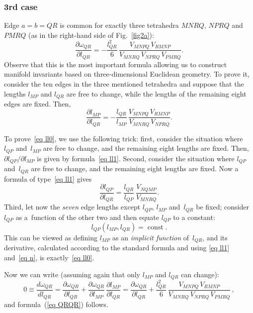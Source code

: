 \documentclass[pdftex]{sigma}
\DeclareMathOperator{\const}{const}
\begin{document}
\subsubsection*{3rd case}
Edge $a=b=QR$ is common for exactly three tetrahedra $MNRQ$, $NPRQ$ and~$PMRQ$ (as in the right-hand side of Fig.~\ref{fig2a}):
\begin{equation}
\frac{\partial \omega_{QR}}{\partial l_{QR}} = -\frac {l_{QR}^2}{6}\, \frac {V_{MNPQ}\,V_{RMNP}}{V_{MNRQ}\,V_{NPRQ}\,V_{PMRQ}}.
\label{eq QRQR}
\end{equation}
Observe that this is the most important formula allowing us to construct manifold invariants based on three-dimensional Euclidean geometry. To prove it, consider the ten edges in the three mentioned tetrahedra and suppose that the lengths $l_{MP}$ and $l_{QR}$ are free to change, while the lengths of the remaining eight edges are f\/ixed. Then,
\begin{equation}
\frac{\partial l_{MP}}{\partial l_{QR}} = -\frac{l_{QR}}{l_{MP}}\, \frac{V_{MNPQ}\,V_{RMNP}}{V_{MNRQ}\, V_{NPRQ}}.
\label{eq ll0}
\end{equation}

To prove~\eqref{eq ll0}, we use the following trick: f\/irst, consider the situation where $l_{QP}$ and~$l_{MP}$ are free to change, and the remaining eight lengths are f\/ixed. Then, $\partial l_{QP} / \partial l_{MP}$ is given by formula~\eqref{eq ll1}. Second, consider the situation where $l_{QP}$ and~$l_{QR}$ are free to change, and the remaining eight lengths are f\/ixed. Now a formula of type~\eqref{eq ll1} gives
\begin{equation}
\frac{\partial l_{QP}}{\partial l_{QR}} = \frac{l_{QR}}{l_{QP}}\, \frac{V_{NQMP}}{V_{MNRQ}}.
\label{eq n}
\end{equation}
Third, let now the \emph{seven} edge lengths except $l_{QP}$, $l_{MP}$ and~$l_{QR}$ be f\/ixed; consider $l_{QP}$ as a~function of the other two and then equate $l_{QP}$ to a constant:
\begin{equation*}
l_{QP}(l_{MP},l_{QR}) = \const .
\end{equation*}
This can be viewed as def\/ining $l_{MP}$ as an \emph{implicit function} of~$l_{QR}$, and its derivative, calculated according to the standard formula and using \eqref{eq ll1} and~\eqref{eq n}, is exactly~\eqref{eq ll0}.

Now we can write (assuming again that only $l_{MP}$ and $l_{QR}$ can change):
\begin{equation*}
0 \equiv \frac{d\omega_{QR}}{dl_{QR}} = \frac{\partial \omega_{QR}}{\partial l_{QR}} + \frac{\partial \omega_{QR}}{\partial l_{MP}}\, \frac{\partial l_{MP}}{\partial l_{QR}} = \frac{\partial \omega_{QR}}{\partial l_{QR}} + \frac {l_{QR}^2}{6}\, \frac{V_{MNPQ}\, V_{RMNP}}{V_{MNRQ}\, V_{NPRQ}\, V_{PMRQ}} \, ,
\end{equation*}
and formula~(\ref{eq QRQR}) follows.
\end{document}
